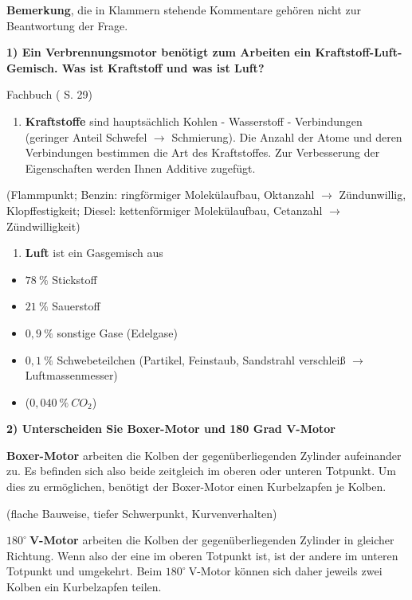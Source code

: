 \textbf{Bemerkung}, die in Klammern stehende Kommentare gehören nicht
zur Beantwortung der Frage.

\textbf{1) Ein Verbrennungsmotor benötigt zum Arbeiten ein
Kraftstoff-Luft-Gemisch. Was ist Kraftstoff und was ist Luft?}

Fachbuch (\textcite{brand:2020:fachkundeKfz} S. 29)

\begin{enumerate}
\def\labelenumi{(\arabic{enumi})}
\item
  \textbf{Kraftstoffe} sind hauptsächlich Kohlen - Wasserstoff -
  Verbindungen (geringer Anteil Schwefel $\to$ Schmierung). Die Anzahl
  der Atome und deren Verbindungen bestimmen die Art des Kraftstoffes.
  Zur Verbesserung der Eigenschaften werden Ihnen Additive zugefügt.
\end{enumerate}

(Flammpunkt; Benzin: ringförmiger Molekülaufbau, Oktanzahl $\to$
Zündunwillig, Klopffestigkeit; Diesel: kettenförmiger Molekülaufbau,
Cetanzahl $\to$ Zündwilligkeit)

\begin{enumerate}
\def\labelenumi{(\arabic{enumi})}
\setcounter{enumi}{1}
\item
  \textbf{Luft} ist ein Gasgemisch aus
\end{enumerate}

\begin{itemize}
\item
  $78~\%$ Stickstoff
\item
  $21~\%$ Sauerstoff
\item
  $0,9~\%$ sonstige Gase (Edelgase)
\item
  $0,1~\%$ Schwebeteilchen (Partikel, Feinstaub, Sandstrahl verschleiß
  $\to$ Luftmassenmesser)
\item
  ($0,040~\% ~ CO_2$)
\end{itemize}

\textbf{2) Unterscheiden Sie Boxer-Motor und 180 Grad V-Motor}

\textbf{Boxer-Motor} arbeiten die Kolben der gegenüberliegenden Zylinder
aufeinander zu. Es befinden sich also beide zeitgleich im oberen oder
unteren Totpunkt. Um dies zu ermöglichen, benötigt der Boxer-Motor einen
Kurbelzapfen je Kolben.

(flache Bauweise, tiefer Schwerpunkt, Kurvenverhalten)

$180^\circ~$\textbf{V-Motor} arbeiten die Kolben der
gegenüberliegenden Zylinder in gleicher Richtung. Wenn also der eine im
oberen Totpunkt ist, ist der andere im unteren Totpunkt und umgekehrt.
Beim $180^\circ~$V-Motor können sich daher jeweils zwei Kolben ein
Kurbelzapfen teilen.


